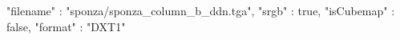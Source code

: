 { 
	"filename" : "sponza/sponza_column_b_ddn.tga", 
	"srgb" : true,
	"isCubemap" : false,
	"format" : "DXT1"
}